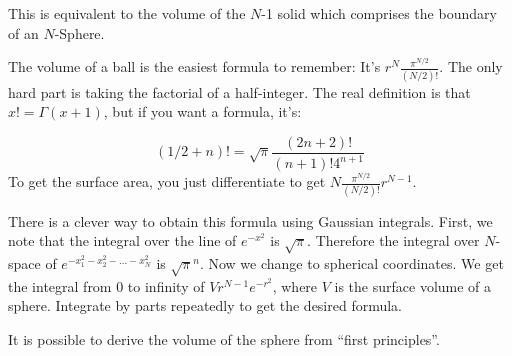 This is equivalent to the volume of the $N$-1
    solid which comprises the boundary of an $N$-Sphere.

The volume of a ball is the easiest formula to remember:  It's 
$r^N \frac{\pi^{N/2}}{(N/2)!}$.
     The only hard part is taking the factorial
    of a half-integer.  The real definition is that $x! = \Gamma(x+1)$, but
    if you want a formula, it's:

    \[(1/2+n)! = \sqrt{\pi} \frac{(2n+2)!}{(n+1)!4^{n+1}}\]
    To get the surface area, you just differentiate to get
    $N\frac{\pi^{N/2}}{(N/2)!}r^{N-1}$.

    There is a clever way to obtain this formula using Gaussian
    integrals. First, we note that the integral over the line of
    $e^{-x^2}$ is $\sqrt{\pi}$.  Therefore the integral over $N$-space of
    $e^{-x_1^2-x_2^2-...-x_N^2}$ is $\sqrt{\pi}^n$.  Now we change to
    spherical coordinates.  We get the integral from 0 to infinity
    of $Vr^{N-1}e^{-r^2}$, where $V$ is the surface volume of a sphere.
    Integrate by parts repeatedly to get the desired formula.

    It is possible to derive the volume of the sphere from ``first 
    principles''.
